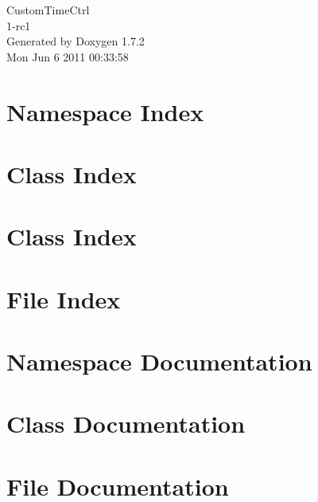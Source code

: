 \documentclass[a4paper]{book}
\begin{document}
\hypersetup{pageanchor=false}
\begin{titlepage}
\vspace*{7cm}
\begin{center}
{\Large CustomTimeCtrl \\[1ex]\large 1-\/rc1 }\\
\vspace*{1cm}
{\large Generated by Doxygen 1.7.2}\\
\vspace*{0.5cm}
{\small Mon Jun 6 2011 00:33:58}\\
\end{center}
\end{titlepage}
\clearemptydoublepage
{}
\tableofcontents
\clearemptydoublepage
{}
\hypersetup{pageanchor=true}
\chapter{Namespace Index}

\chapter{Class Index}

\chapter{Class Index}

\chapter{File Index}

\chapter{Namespace Documentation}

\chapter{Class Documentation}




\chapter{File Documentation}










\printindex
\end{document}
